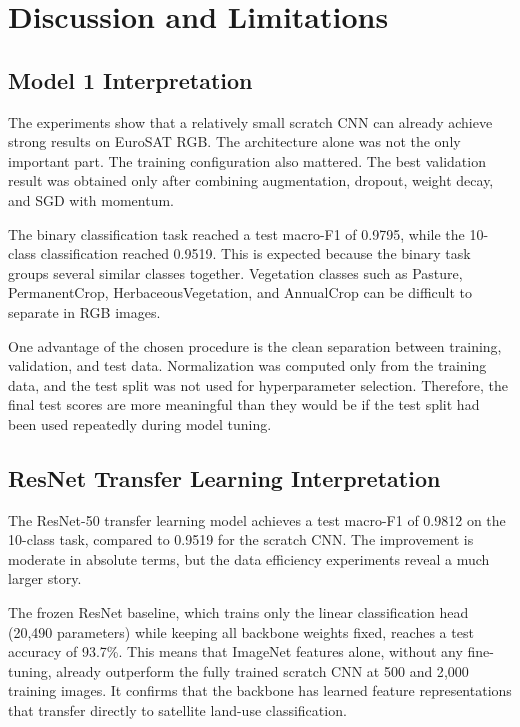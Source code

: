 \section{Discussion and Limitations}

\subsection{Model 1 Interpretation}

The experiments show that a relatively small scratch CNN can already achieve
strong results on EuroSAT RGB. The architecture alone was not the only important
part. The training configuration also mattered. The best validation result was
obtained only after combining augmentation, dropout, weight decay, and SGD with
momentum.

The binary classification task
reached a test macro-F1 of 0.9795, while the 10-class classification reached
0.9519. This is expected because the binary task groups several similar classes
together. Vegetation classes such as Pasture, PermanentCrop,
HerbaceousVegetation, and AnnualCrop can be difficult to separate in RGB images.

One advantage of the chosen procedure is the clean separation between training,
validation, and test data. Normalization was computed only from the training
data, and the test split was not used for hyperparameter selection. Therefore,
the final test scores are more meaningful than they would be if the test split
had been used repeatedly during model tuning.

\subsection{ResNet Transfer Learning Interpretation}

The ResNet-50 transfer learning model achieves a test macro-F1 of 0.9812 on the
10-class task, compared to 0.9519 for the scratch CNN. The improvement is
moderate in absolute terms, but the data efficiency experiments reveal a much
larger story.

The frozen ResNet baseline, which trains only the linear classification head
(20{,}490 parameters) while keeping all backbone weights fixed, reaches a test
accuracy of 93.7\%. This means that ImageNet features alone, without any
fine-tuning, already outperform the fully trained scratch CNN at 500 and 2{,}000
training images. It confirms that the backbone has learned feature representations
that transfer directly to satellite land-use classification.

